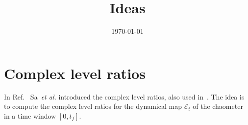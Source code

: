 \documentclass[10pt,a4paper]{article}
\title{Ideas}
\date{\today}
\begin{document}
\maketitle

\section*{Complex level ratios}
In Ref.~\cite{sa_complex_2020} Sa~\textit{et al.} introduced the complex level ratios, 
also used in~\cite{richter_integrability_2024}. The idea is to compute the complex 
level ratios for the dynamical map $\mathcal E_t$ of the chaometer 
in a time window $[0, t_f]$. 



\end{document}
